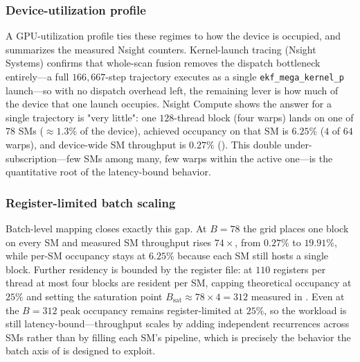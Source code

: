 \subsubsection{Device-utilization profile}
A GPU-utilization profile ties these regimes to how the device is occupied, and  summarizes the measured Nsight counters. Kernel-launch tracing (Nsight Systems) confirms that whole-scan fusion removes the dispatch bottleneck entirely---a full $166{,}667$-step trajectory executes as a single \texttt{ekf\_mega\_kernel\_p} launch---so with no dispatch overhead left, the remaining lever is how much of the device that one launch occupies. Nsight Compute shows the answer for a single trajectory is "very little": one $128$-thread block (four warps) lands on one of $78$ SMs ($\approx1.3\%$ of the device), achieved occupancy on that SM is $6.25\%$ ($4$ of $64$ warps), and device-wide SM throughput is $0.27\%$ (). This double under-subscription---few SMs among many, few warps within the active one---is the quantitative root of the latency-bound behavior.

\subsubsection{Register-limited batch scaling}
Batch-level mapping closes exactly this gap. At $B{=}78$ the grid places one block on every SM and measured SM throughput rises $74\times$, from $0.27\%$ to $19.91\%$, while per-SM occupancy stays at $6.25\%$ because each SM still hosts a single block. Further residency is bounded by the register file: at $110$ registers per thread at most four blocks are resident per SM, capping theoretical occupancy at $25\%$ and setting the saturation point $B_{\mathrm{sat}}\approx78\times4=312$ measured in . Even at the $B{=}312$ peak occupancy remains register-limited at $25\%$, so the workload is still latency-bound---throughput scales by adding independent recurrences across SMs rather than by filling each SM's pipeline, which is precisely the behavior the batch axis of  is designed to exploit.

